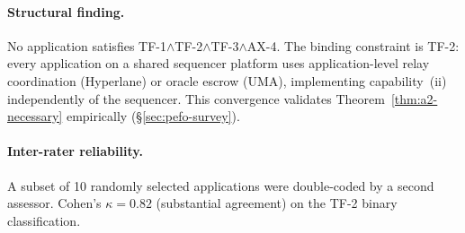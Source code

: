 \paragraph{Structural finding.}
No application satisfies TF-1$\wedge$TF-2$\wedge$TF-3$\wedge$AX-4.
The binding constraint is TF-2: every application on a shared sequencer
platform uses application-level relay coordination (Hyperlane) or oracle
escrow (UMA), implementing capability~(ii) independently of the sequencer.
This convergence validates Theorem~\ref{thm:a2-necessary} empirically
(\S\ref{sec:pefo-survey}).

\paragraph{Inter-rater reliability.}
A subset of 10 randomly selected applications were double-coded
by a second assessor. Cohen's $\kappa = 0.82$ (substantial agreement)
on the TF-2 binary classification.
